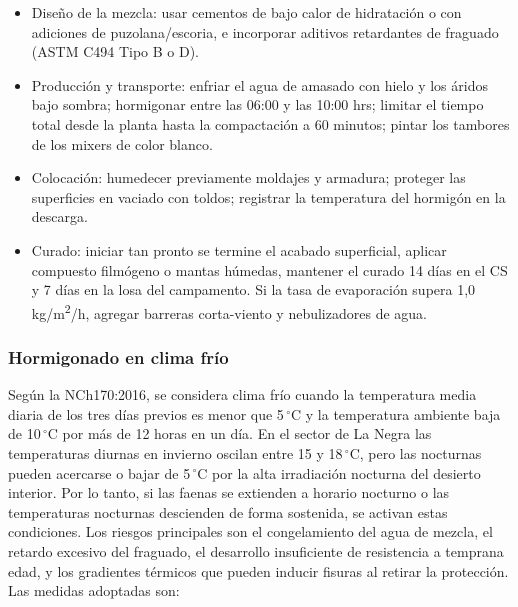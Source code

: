 \begin{itemize}
    \item Diseño de la mezcla: usar cementos de bajo calor de hidratación o con adiciones de puzolana/escoria, e incorporar aditivos retardantes de fraguado (ASTM C494 Tipo B o D).
    \item Producción y transporte: enfriar el agua de amasado con hielo y los áridos bajo sombra; hormigonar entre las 06:00 y las 10:00 hrs; limitar el tiempo total desde la planta hasta la compactación a 60 minutos; pintar los tambores de los mixers de color blanco.
    \item Colocación: humedecer previamente moldajes y armadura; proteger las superficies en vaciado con toldos; registrar la temperatura del hormigón en la descarga.
    \item Curado: iniciar tan pronto se termine el acabado superficial, aplicar compuesto filmógeno o mantas húmedas, mantener el curado 14 días en el CS y 7 días en la losa del campamento. Si la tasa de evaporación supera 1,0 kg/m\textsuperscript{2}/h, agregar barreras corta-viento y nebulizadores de agua.
\end{itemize}

\subsubsection{Hormigonado en clima frío}

Según la NCh170:2016, se considera clima frío cuando la temperatura media diaria de los tres días previos es menor que 5\,$^\circ$C y la temperatura ambiente baja de 10\,$^\circ$C por más de 12 horas en un día. En el sector de La Negra las temperaturas diurnas en invierno oscilan entre 15 y 18\,$^\circ$C, pero las nocturnas pueden acercarse o bajar de 5\,$^\circ$C por la alta irradiación nocturna del desierto interior. Por lo tanto, si las faenas se extienden a horario nocturno o las temperaturas nocturnas descienden de forma sostenida, se activan estas condiciones. Los riesgos principales son el congelamiento del agua de mezcla, el retardo excesivo del fraguado, el desarrollo insuficiente de resistencia a temprana edad, y los gradientes térmicos que pueden inducir fisuras al retirar la protección. Las medidas adoptadas son:

